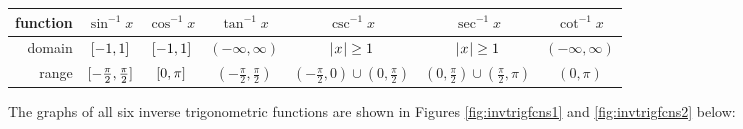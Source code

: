 \begin{center}
\bgroup
\def\arraystretch{1.5}
\begin{tabular}{@{}|r||c|c|c|c|c|c|@{}}
\hline
function & $\sin^{-1} x$ & $\cos^{-1} x$ & $\tan^{-1} x$ & $\csc^{-1} x$ & $\sec^{-1} x$ & $\cot^{-1} x$\\
\hline
domain & $\lbrack -1,1 \rbrack$ & $\lbrack -1,1 \rbrack$ & $(-\infty,\infty)$ & $\lvert\mspace{1mu}x\mspace{1mu}\rvert \ge 1$ & $\lvert\mspace{1mu}x\mspace{1mu}\rvert \ge 1$
& $(-\infty,\infty)$\\
\hline
range & $\lbrack -\tfrac{\pi}{2},\tfrac{\pi}{2} \rbrack$ & $\lbrack 0,\pi \rbrack$ &
$\left(-\tfrac{\pi}{2},\tfrac{\pi}{2}\right)$ &
$\left(-\tfrac{\pi}{2},0\right) \cup \left(0,\tfrac{\pi}{2}\right)$ &
$\left(0,\tfrac{\pi}{2}\right) \cup \left(\tfrac{\pi}{2},\pi\right)$ &
$(0,\pi)$\\
\hline
\end{tabular}
\egroup
\end{center}

\noindent The graphs of all six inverse trigonometric functions are shown in
Figures \ref{fig:invtrigfcns1} and \ref{fig:invtrigfcns2} below:

